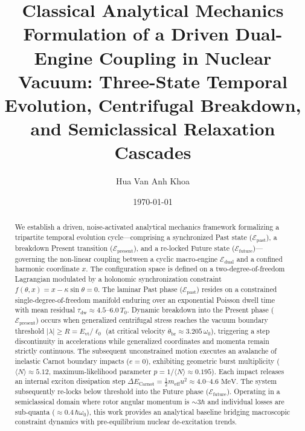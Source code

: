 \documentclass[aps,prc,twocolumn,superscriptaddress,amsmath,amssymb,nofootinbib]{revtex4-2}
\begin{document}
\title{Classical Analytical Mechanics Formulation of a Driven Dual-Engine Coupling in Nuclear Vacuum: Three-State Temporal Evolution, Centrifugal Breakdown, and Semiclassical Relaxation Cascades}

\author{Hua Van Anh Khoa}

\date{\today}

\begin{abstract}
We establish a driven, noise-activated analytical mechanics framework formalizing a tripartite temporal evolution cycle---comprising a synchronized Past state (\(\mathcal{E}_{\text{past}}\)), a breakdown Present transition (\(\mathcal{E}_{\text{present}}\)), and a re-locked Future state (\(\mathcal{E}_{\text{future}}\))---governing the non-linear coupling between a cyclic macro-engine \(\mathcal{E}_{\text{dual}}\) and a confined harmonic coordinate \(x\). The configuration space is defined on a two-degree-of-freedom Lagrangian modulated by a holonomic synchronization constraint \(f(\theta, x) = x - \kappa \sin\theta = 0\). The laminar Past phase (\(\mathcal{E}_{\text{past}}\)) resides on a constrained single-degree-of-freedom manifold enduring over an exponential Poisson dwell time with mean residual \(\tau_{\text{dw}} \approx 4.5\text{--}6.0\,T_0\). Dynamic breakdown into the Present phase (\(\mathcal{E}_{\text{present}}\)) occurs when generalized centrifugal stress reaches the vacuum boundary threshold \(|\lambda| \ge R = E_{\text{vt}}/\ell_0\) (at critical velocity \(\dot{\theta}_{\text{br}} \approx 3.205\,\omega_0\)), triggering a step discontinuity in accelerations while generalized coordinates and momenta remain strictly continuous. The subsequent unconstrained motion executes an avalanche of inelastic Carnot boundary impacts (\(e=0\)), exhibiting geometric burst multiplicity (\(\langle N \rangle \approx 5.12\), maximum-likelihood parameter \(p = 1/\langle N \rangle \approx 0.195\)). Each impact releases an internal exciton dissipation step \(\Delta E_{\text{Carnot}} = \frac{1}{2}m_{\text{eff}} u^2 \approx 4.0\text{--}4.6\text{ MeV}\). The system subsequently re-locks below threshold into the Future phase (\(\mathcal{E}_{\text{future}}\)). Operating in a semiclassical domain where rotor angular momentum is \(\sim 3\hbar\) and individual losses are sub-quanta (\(\approx 0.4\,\hbar\omega_0\)), this work provides an analytical baseline bridging macroscopic constraint dynamics with pre-equilibrium nuclear de-excitation trends.
\end{abstract}
\end{document}
